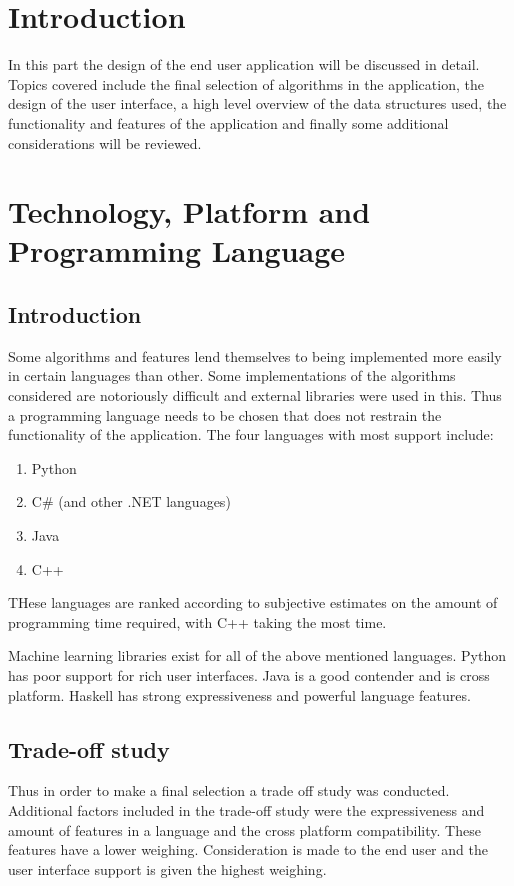 

\chapter{Introduction}
In this part the design of the end user application will be discussed in detail. Topics covered include the final selection of algorithms in the application, the design of the user interface, a high level overview of the data structures used, the functionality and features of the application and finally some additional considerations will be reviewed.

\chapter{Technology, Platform and Programming Language}
\section{Introduction}
Some algorithms and features lend themselves to being implemented more easily in certain languages than other. Some implementations of the algorithms considered are notoriously difficult and external libraries were used in this. Thus a programming language needs to be chosen that does not restrain the functionality of the application. 
The four languages with most support include:
\begin{enumerate}
\item Python
\item C\# (and other .NET languages)
\item Java
\item C++
\end{enumerate}
THese languages are ranked according to subjective estimates on the amount of programming time required, with C++ taking the most time.

Machine learning libraries exist for all of the above mentioned languages. Python has poor support for rich user interfaces. Java is a good contender and is cross platform. Haskell has strong expressiveness and powerful language features.


\section{Trade-off study}

Thus in order to make a final selection a trade off study was conducted. Additional factors included in the trade-off study were the expressiveness and amount of features in a language and the cross platform compatibility. These features have a lower weighing.
Consideration is made to the end user and the user interface support is given the highest weighing.  

